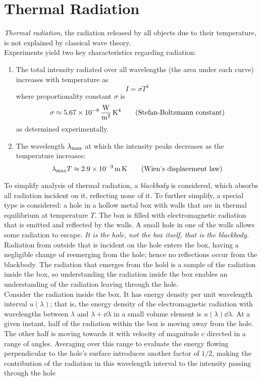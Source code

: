 \documentclass{subfiles}
\begin{document}
	\section{Thermal Radiation}
		\textit{Thermal radiation}, the radiation released by all objects due to their temperature, is not explained by classical wave theory. \\
		Experiments yield two key characteristics regarding radiation:
			\begin{enumerate}
				\item
					The total intensity radiated over all wavelengths (the area under each curve) increases with temperature as
						\[I = \sigma T^4 \tag{Stefan's law}\]
						where proportionality constant \(\sigma\) is
						\[\sigma \approx \SI{5.67E-8}{\frac{W}{m^2}.K^4} \tag{Stefan-Boltzmann constant}\]
						as determined experimentally.
				\item
					The wavelength \(\lambda_{\text{max}}\) at which the intensity peaks decreases as the temperature increases:
					\[\lambda_{\text{max}}T \approx \SI{2.9E-3}{m.K} \tag{Wien's displacement law}\]
			\end{enumerate}
		To simplify analysis of thermal radiation, a \textit{blackbody} is considered, which absorbs all radiation incident on it, reflecting none of it. To further simplify, a special type is considered: a hole in a hollow metal box with walls that are in thermal equilibrium at temperature \(T\). The box is filled with electromagnetic radiation that is emitted and reflected by the walls. A small hole in one of the walls allows some radiation to escape. \textit{It is the hole, not the box itself, that is the blackbody.} Radiation from outside that is incident on the hole enters the box, having a negligible change of reemerging from the hole; hence no reflections occur from the blackbody. The radiation that emerges from the hold is a sample of the radiation inside the box, so understanding the radiation inside the box enables an understanding of the radiation leaving through the hole. \\
			Consider the radiation inside the box. It has energy density per unit wavelength interval \(u(\lambda)\); that is, the energy density of the electromagnetic radiation with wavelengths between \(\lambda\) and \(\lambda + \dd{\lambda}\) in a small volume element is \(u(\lambda)\dd{\lambda}\). At a given instant, half of the radiation within the box is moving away from the hole. The other half is moving towards it with velocity of magnitude \(c\) directed in a range of angles. Averaging over this range to evaluate the energy flowing perpendicular to the hole's surface introduces another factor of \(1/2\), making the contribution of the radiation in this wavelength interval to the intensity passing through the hole
\end{document}
